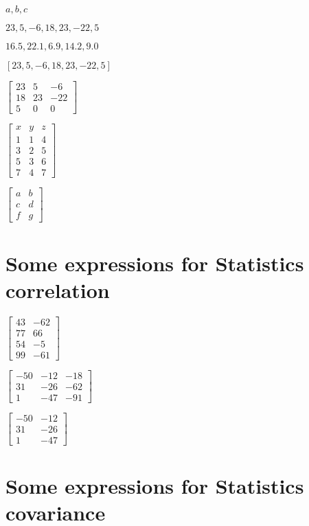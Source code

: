 \documentclass{article}
\begin{document}
$a,b,c$

$23,5,-6,18,23,-22,5$

$16.5,22.1,6.9,14.2,9.0$

$\left[ 23,5,-6,18,23,-22,5\right] $

$\left[ 
\begin{array}{ccc}
23 & 5 & -6 \\ 
18 & 23 & -22 \\ 
5 & 0 & 0%
\end{array}%
\right] $

$\left[ 
\begin{array}{ccc}
x & y & z \\ 
1 & 1 & 4 \\ 
3 & 2 & 5 \\ 
5 & 3 & 6 \\ 
7 & 4 & 7%
\end{array}%
\right] $

$\left[ 
\begin{array}{cc}
a & b \\ 
c & d \\ 
f & g%
\end{array}%
\right] $

\section{Some expressions for Statistics correlation}

$\left[ 
\begin{array}{rr}
43 & -62 \\ 
77 & 66 \\ 
54 & -5 \\ 
99 & -61%
\end{array}%
\right] $

$\left[ 
\begin{array}{rrr}
-50 & -12 & -18 \\ 
31 & -26 & -62 \\ 
1 & -47 & -91%
\end{array}%
\right] $

$\left[ 
\begin{array}{rr}
-50 & -12 \\ 
31 & -26 \\ 
1 & -47%
\end{array}%
\right] $

\section{Some expressions for Statistics covariance}
\end{document}
